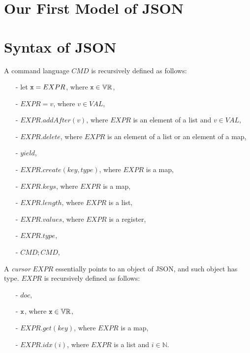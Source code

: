 
\section{Our First Model of JSON}
\label{sec:our first model of json}



\section{Syntax of JSON}
\label{sec:syntax of json}

A command language $CMD$ is recursively defined as follows:

\begin{itemize}
\setlength{\itemsep}{0.5pt}
\item[-] let $\mathtt{x} = EXPR$, where $\mathtt{x} \in \mathbb{VR}$,

\item[-] $EXPR = v$, where $v \in VAL$,

\item[-] $EXPR.addAfter(v)$, where $EXPR$ is an element of a list and $v \in VAL$,

\item[-] $EXPR.delete$, where $EXPR$ is an element of a list or an element of a map,

\item[-] $yield$,

\item[-] $EXPR.create(key,type)$, where $EXPR$ is a map,

\item[-] $EXPR.keys$, where $EXPR$ is a map,

\item[-] $EXPR.length$, where $EXPR$ is a list,

\item[-] $EXPR.values$, where $EXPR$ is a register,

\item[-] $EXPR.type$,

\item[-] $CMD; CMD$,
\end{itemize}

A \emph{cursor} $EXPR$ essentially points to an object of JSON, and such object has type. $EXPR$ is recursively defined as follows:

\begin{itemize}
\setlength{\itemsep}{0.5pt}
\item[-] $doc$,

\item[-] $\mathtt{x}$, where $\mathtt{x} \in \mathbb{VR}$,

\item[-] $EXPR.get(key)$, where $EXPR$ is a map,

\item[-] $EXPR.idx(i)$, where $EXPR$ is a list and $i \in \mathbb{N}$.
\end{itemize}

